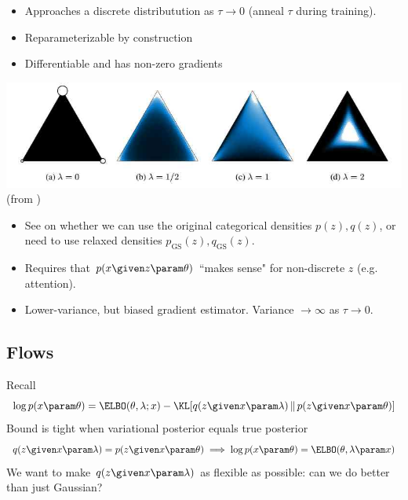 \begin{frame}

\begin{itemize}
    \item Approaches a discrete distributution as $\tau \to 0$ (anneal $\tau$ during training).
    \item Reparameterizable by construction
    \item Differentiable and has non-zero gradients
\end{itemize}
\center
\includegraphics[scale=0.3]{pics/concrete.jpg} \\
(from \cite{Maddison2017})
\end{frame}

\begin{frame}

\begin{itemize}
\item See \cite{Maddison2017} on whether we can use the original categorical densities $p(z), q(z)$, or need to use relaxed densities $p_{\text{GS}}(z), q_{\text{GS}}(z)$.
\item Requires that $p(x \given z \param \theta)$ ``makes sense" for non-discrete $z$ (e.g. attention).
    \item Lower-variance, but biased gradient estimator. Variance $\to \infty$ as $\tau \to 0$.
\end{itemize}
\end{frame}

\subsection{Flows}

\begin{frame}
Recall
\[ \log p(x \param \theta)  = \ELBO(\theta, \lambda; x) - \KL[q(z \given x \param \lambda)  \, \Vert \, p(z \given x \param \theta)]  \]
\pause
Bound is tight when variational posterior equals true posterior
\[ q(z \given x \param \lambda) = p(z \given x \param \theta) \implies \log p(x \param \theta) = \ELBO( \theta,  \lambda \param x) \]
We want to make $q(z \given x \param \lambda)$ as flexible as possible:
can we do better than just Gaussian?
\end{frame} 

